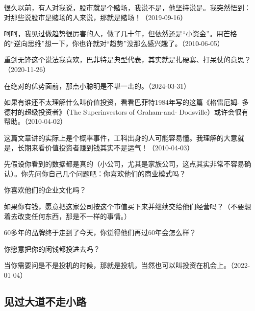 很久以前，有人对我说，股市就是个赌场，我说不是，他坚持说是。我突然悟到：对那些说股市是赌场的人来说，那就是赌场！（2019-09-16）


呵呵，我见过做趋势很厉害的人，做了几十年，但依然还是“小资金”。用芒格的“逆向思维”想一下，你也许就对“趋势”没那么感兴趣了。（2010-06-05）


重剑无锋这个说法我喜欢，巴菲特是典型代表，其实就是扎硬寨、打呆仗的意思？（2020-11-26）


在绝对的优势面前，那点小聪明是不堪一击的。（2024-03-31）

如果有谁还不太理解什么叫价值投资，看看巴菲特1984年写的这篇《格雷厄姆- 多德村的超级投资者》（The Superinvestors of Graham-and- Dodsville）或许会很有帮助。（2010-04-02）

这篇文章讲的实际上是个概率事件，工科出身的人可能容易懂。我理解的大意就是，长期来看价值投资者赚到钱其实不是运气！（2010-04-03）


先假设你看到的数据都是真的（小公司，尤其是家族公司，这点其实非常不容易确认）。你先问你自己几个问题吧：你喜欢他们的商业模式吗？

你喜欢他们的企业文化吗？

如果你有钱，愿意把这家公司按这个市值买下来并继续交给他们经营吗？（不要想着去改变任何东西，那是不一样的事情。）

60多年的品牌终于走到了今天，你觉得他们再过60年会怎么样？

你愿意把你的闲钱都投进去吗？

当你需要问是不是投机的时候，那就是投机，当然也可以叫投资在机会上。（2022-01-04）

\subsection{见过大道不走小路}

